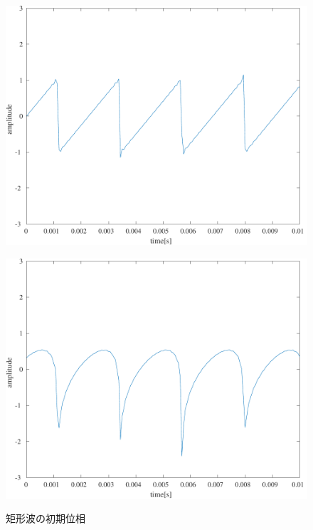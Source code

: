 \begin{figure}[H]
\begin{minipage}[b]{.24\textwidth}
    \end{minipage}
    \caption{矩形波の初期位相}
    \label{fig:矩形波の初期位相}
    \begin{minipage}{.24\textwidth}
        \centering
        \label{fig:実験結果ノコギリ波_pure}
        \includegraphics[keepaspectratio,width=\textwidth]{../../Figures/03_21_nokogiri.pdf}
    \end{minipage}
    \begin{minipage}{.24\textwidth}
        \centering
        \label{fig:実験結果ノコギリ波_p4PI}
        \includegraphics[keepaspectratio,width=\textwidth]{../../Figures/03_22.pdf}

\end{minipage}
\end{figure}
